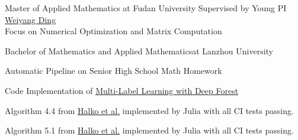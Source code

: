 

\sepspace




{Master of Applied Mathematics }{at Fudan University}
{Supervised by Young PI \href{https://scholar.google.com/citations?user=bLERs80AAAAJ&hl=zh-CN}{Weiyang Ding}\\
Focus on Numerical Optimization and Matrix Computation}
\sepspace

{Bachelor of Mathematics and Applied Mathematics}{at Lanzhou University}
\sepspace




{\begin{compactitem}
    \item Automatic Pipeline on Senior High School Math Homework 
    \item Code Implementation of  \href{https://arxiv.org/abs/1911.06557}{Multi-Label Learning with Deep Forest}
\end{compactitem}
}



{\begin{compactitem}
    \item Algorithm 4.4 from \href{https://arxiv.org/abs/0909.4061}{Halko et al.} implemented by Julia with all CI tests passing.
    \item Algorithm 5.1 from \href{https://arxiv.org/abs/0909.4061}{Halko et al.} implemented by Julia with all CI tests passing.
\end{compactitem}
}

